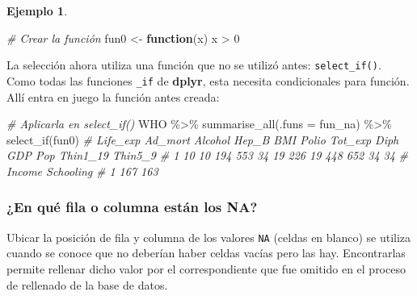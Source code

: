 \documentclass[
]{article}
\newenvironment{Shaded}{\begin{snugshade}}{\end{snugshade}}
\newcommand{\AttributeTok}[1]{\textcolor[rgb]{0.77,0.63,0.00}{#1}}
\newcommand{\CommentTok}[1]{\textcolor[rgb]{0.56,0.35,0.01}{\textit{#1}}}
\newcommand{\ControlFlowTok}[1]{\textcolor[rgb]{0.13,0.29,0.53}{\textbf{#1}}}
\newcommand{\DecValTok}[1]{\textcolor[rgb]{0.00,0.00,0.81}{#1}}
\newcommand{\FunctionTok}[1]{\textcolor[rgb]{0.00,0.00,0.00}{#1}}
\newcommand{\NormalTok}[1]{#1}
\newcommand{\OtherTok}[1]{\textcolor[rgb]{0.56,0.35,0.01}{#1}}
\newcommand{\SpecialCharTok}[1]{\textcolor[rgb]{0.00,0.00,0.00}{#1}}
\theoremstyle{definition}
\theoremstyle{definition}
\newtheorem{example}{Ejemplo}[section]
\theoremstyle{definition}
\theoremstyle{definition}
\theoremstyle{remark}
\begin{document}
\begin{example}
\begin{Shaded}
\begin{Highlighting}[]
\CommentTok{\# Crear la función }
\NormalTok{fun0 }\OtherTok{\textless{}{-}} \ControlFlowTok{function}\NormalTok{(x) x }\SpecialCharTok{\textgreater{}} \DecValTok{0}
\end{Highlighting}
\end{Shaded}

La selección ahora utiliza una función que no se utilizó antes: \texttt{select\_if()}. Como todas las funciones \texttt{\_if} de \textbf{dplyr}, esta necesita condicionales para función. Allí entra en juego la función antes creada:

\begin{Shaded}
\begin{Highlighting}[]
\CommentTok{\# Aplicarla en select\_if()}
\NormalTok{WHO }\SpecialCharTok{\%\textgreater{}\%} 
  \FunctionTok{summarise\_all}\NormalTok{(}\AttributeTok{.funs =}\NormalTok{ fun\_na) }\SpecialCharTok{\%\textgreater{}\%} 
  \FunctionTok{select\_if}\NormalTok{(fun0)}
\CommentTok{\#   Life\_exp Ad\_mort Alcohol Hep\_B BMI Polio Tot\_exp Diph GDP Pop Thin1\_19 Thin5\_9}
\CommentTok{\# 1       10      10     194   553  34    19     226   19 448 652       34      34}
\CommentTok{\#   Income Schooling}
\CommentTok{\# 1    167       163}
\end{Highlighting}
\end{Shaded}

\end{example}

\hypertarget{en-quuxe9-fila-o-columna-estuxe1n-los-na}{%
\subsubsection{¿En qué fila o columna están los NA?}\label{en-quuxe9-fila-o-columna-estuxe1n-los-na}}

Ubicar la posición de fila y columna de los valores \texttt{NA} (celdas en blanco) se utiliza cuando se conoce que no deberían haber celdas vacías pero las hay. Encontrarlas permite rellenar dicho valor por el correspondiente que fue omitido en el proceso de rellenado de la base de datos.
\end{document}
